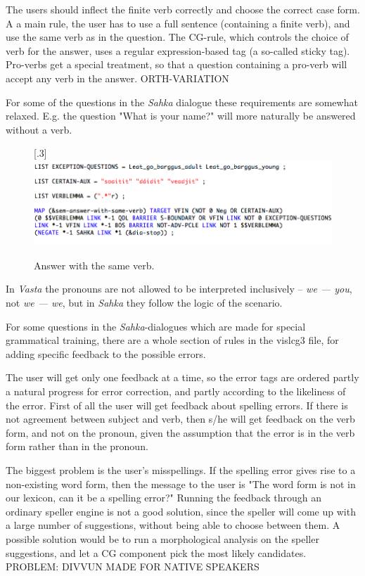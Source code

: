 \documentclass[11pt]{article}
\begin{document}
The users should inflect the finite verb correctly and choose the correct case form. A a main rule, the user has to use a full sentence (containing a finite verb), and use the same verb as in the question. The CG-rule, which controls the choice of verb for the answer, uses a regular expression-based tag (a so-called sticky tag). Pro-verbs get a special treatment, so that a question containing a pro-verb will accept any verb in the answer. ORTH-VARIATION

For some of the questions in the \textit{Sahka} dialogue these requirements are somewhat relaxed. E.g. the question "What is your name?" will more naturally be answered without a verb. 

\begin{figure}%
\begin{center}
\scalebox{.3}[.3]{\includegraphics{presentation/img/verblemma.png}}\\
\caption{Answer with the same verb.}
\end{center}
\end{figure}


In \textit{Vasta} the pronouns are not allowed to be interpreted inclusively -- \textit{we — you}, not \textit{we — we}, but in \textit{Sahka} they follow the logic of the scenario.

For some questions in the \textit{Sahka}-dialogues which are made for special grammatical training, there are a whole section of rules in the vislcg3 file, for adding specific feedback to the possible errors.

The user will get only one feedback at a time, so the error tags are ordered partly a natural progress for error correction, and partly according to the likeliness of the error. First of all the user will get feedback about spelling errors. If there is not agreement between subject and verb, then s/he will get feedback on the verb form, and not on the pronoun, given the assumption that the error is in the verb form rather than in the pronoun.

The biggest problem is the user's misspellings. If the spelling error gives rise to a non-existing word form, then the message to the user is "The word form is not in our lexicon, can it be a spelling error?" 
Running the feedback through an ordinary speller engine is not a good solution, since the speller will come up with a large number of suggestions, without being able to choose between them. A possible solution would be to run a morphological analysis on the speller suggestions, and let a CG component pick the most likely candidates. PROBLEM: DIVVUN MADE FOR NATIVE SPEAKERS
\end{document}
